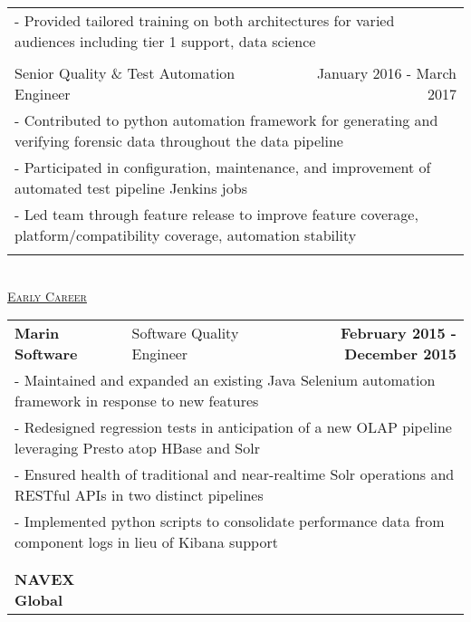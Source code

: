 \documentclass[letterpaper]{article}
\begin{document}
\begin{center}
\begin{tabular}{p{}p{}r}
			\\
				\multicolumn{3}{p{\textwidth}}{\quad\quad - Provided tailored training on both architectures for varied audiences including tier 1 support, data science}
			\\
			\\
				\multicolumn{2}{p{0.5\textwidth}}{\quad Senior Quality \& Test Automation Engineer}
				&
				{January 2016 - March 2017 \quad\quad\quad\quad}
			\\
				\multicolumn{3}{p{\textwidth}}{\quad\quad - Contributed to python automation framework for generating and verifying forensic data throughout the data pipeline} 
			\\
				\multicolumn{3}{p{\textwidth}}{\quad\quad - Participated in configuration, maintenance, and improvement of automated test pipeline Jenkins jobs}
			\\
				\multicolumn{3}{p{\textwidth}}{\quad\quad - Led team through feature release to improve feature coverage, platform/compatibility coverage, automation stability}  
			\\
			\\
		\end{tabular} \\
		\vspace{2.25in}
		\underline{\large \scshape Early Career}
		\begin{tabular}{p{}p{}r}	
			\\ %
				\textbf{Marin Software}									&
				Software Quality Engineer										&
				\textbf{February 2015 - December 2015 \quad}
			\\
				\multicolumn{3}{p{\textwidth}}{\quad\quad - Maintained and expanded an existing Java Selenium automation framework in response to new features} 
			\\
				\multicolumn{3}{p{\textwidth}}{\quad\quad - Redesigned regression tests in anticipation of a new OLAP pipeline leveraging Presto atop HBase and Solr} 
			\\
				\multicolumn{3}{p{\textwidth}}{\quad\quad - Ensured health of traditional and near-realtime Solr operations and RESTful APIs in two distinct pipelines } 
			\\
				\multicolumn{3}{p{\textwidth}}{\quad\quad - Implemented python scripts to consolidate performance data from component logs in lieu of Kibana support } 
			\\
			\\
			\\ %
				\textbf{NAVEX Global}									&

\end{tabular}
\end{center}
\end{document}
